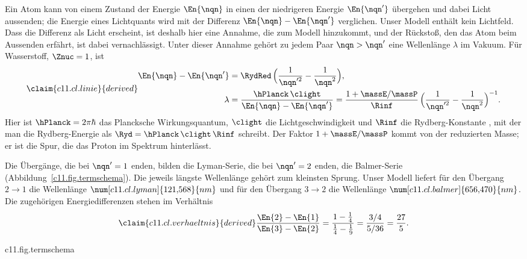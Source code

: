 Ein Atom kann von einem Zustand der Energie $\En{\nqn}$ in einen der niedrigeren Energie
$\En{\nqn'}$ übergehen und dabei Licht aussenden; die Energie eines Lichtquants wird mit
der Differenz $\En{\nqn} - \En{\nqn'}$ verglichen. Unser Modell enthält kein Lichtfeld.
Dass die Differenz als Licht erscheint, ist deshalb hier eine Annahme, die zum Modell
hinzukommt, und der Rückstoß, den das Atom beim Aussenden erfährt, ist dabei
vernachlässigt. Unter dieser Annahme gehört zu jedem Paar $\nqn > \nqn'$ eine
Wellenlänge $\lambda$ im Vakuum. Für Wasserstoff, $\Znuc = 1$, ist
\begin{equation}\label{c11.eq.linie}\claim{c11.cl.linie}{derived}
  \begin{aligned}
    \En{\nqn} - \En{\nqn'} &= \RydRed\,\Bigl(\frac{1}{\nqn'^2} - \frac{1}{\nqn^2}\Bigr), \\
    \lambda &= \frac{\hPlanck\,\clight}{\En{\nqn} - \En{\nqn'}}
             = \frac{1 + \massE/\massP}{\Rinf}\,
               \Bigl(\frac{1}{\nqn'^2} - \frac{1}{\nqn^2}\Bigr)^{-1} .
  \end{aligned}
\end{equation}
Hier ist $\hPlanck = 2\pi\hbar$ das Plancksche Wirkungsquantum, $\clight$ die
Lichtgeschwindigkeit und $\Rinf$ die Rydberg-Konstante
, mit der man die Rydberg-Energie als
$\Ryd = \hPlanck\,\clight\,\Rinf$ schreibt. Der Faktor $1 + \massE/\massP$ kommt von
der reduzierten Masse; er ist die Spur, die das Proton im Spektrum hinterlässt.

Die Übergänge, die bei $\nqn' = 1$ enden, bilden die Lyman-Serie, die bei $\nqn' = 2$
enden, die Balmer-Serie (Abbildung~\ref{c11.fig.termschema}). Die jeweils längste
Wellenlänge gehört zum kleinsten Sprung. Unser Modell liefert für den Übergang
$2 \to 1$ die Wellenlänge $\num[c11.cl.lyman]{121{,}568}{nm}$ und für den Übergang
$3 \to 2$ die Wellenlänge $\num[c11.cl.balmer]{656{,}470}{nm}$. Die zugehörigen
Energiedifferenzen stehen im Verhältnis
\begin{equation}\label{c11.eq.verhaeltnis}\claim{c11.cl.verhaeltnis}{derived}
  \frac{\En{2} - \En{1}}{\En{3} - \En{2}}
  = \frac{1 - \tfrac14}{\tfrac14 - \tfrac19}
  = \frac{3/4}{5/36} = \frac{27}{5} .
\end{equation}

\begin{tpcfigure}{c11.fig.termschema}
  \caption{Das Termschema der Relativbewegung: die Energien $\En{\nqn}$ aus
    \eqref{c11.eq.energien} für $\Znuc = 1$ in Einheiten von $\RydRed$. Die Niveaus
    häufen sich bei $E = 0$. Die Pfeile sind Übergänge; ihre Länge ist maßstäblich die
    Energiedifferenz. Durchgezogen: Lyman-Serie, $\nqn \to 1$. Gestrichelt:
    Balmer-Serie, $\nqn \to 2$.}
\end{tpcfigure}

